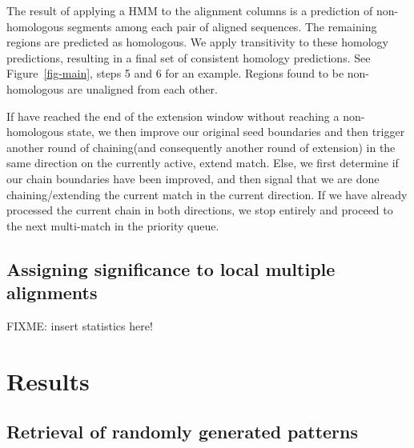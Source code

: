 \documentclass{ws-procs9x6}
\begin{document}
The result of applying a HMM to the alignment columns is a prediction of non-homologous segments among each pair of aligned sequences.  The remaining regions are predicted as homologous.  We apply transitivity to these homology predictions, resulting in a final set of consistent homology predictions.  See Figure~\ref{fig-main}, steps 5 and 6 for an example. Regions found to be non-homologous are unaligned from each other.

If have reached the end of the extension window without reaching a non-homologous state, we then improve our original seed boundaries and then trigger another round of chaining(and consequently another round of extension) in the same direction on the currently active, extend match. Else, we first determine if our chain boundaries have been improved, and then signal that we are done chaining/extending the current match in the current direction. If we have already processed the current chain in both directions, we stop entirely and proceed to the next multi-match in the priority queue.

\subsection{Assigning significance to local multiple alignments}
FIXME: insert statistics here!



\section{Results}


\subsection{Retrieval of randomly generated patterns}

%
%
\end{document}
